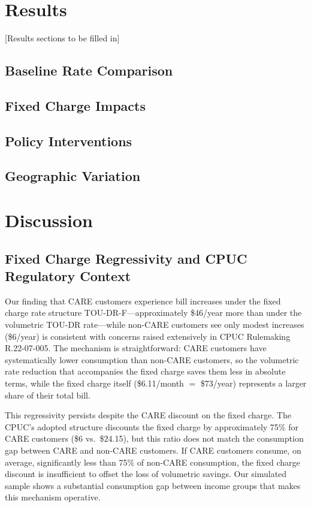 \documentclass[12pt]{article}
\begin{document}
\section{Results}
[Results sections to be filled in]

\subsection{Baseline Rate Comparison}

\subsection{Fixed Charge Impacts}

\subsection{Policy Interventions}

\subsection{Geographic Variation}

\section{Discussion}
\label{sec:discussion}

\subsection{Fixed Charge Regressivity and CPUC Regulatory Context}
\label{sec:regulatory_context}

Our finding that CARE customers experience bill increases under the fixed charge rate structure TOU-DR-F---approximately \$46/year more than under the volumetric TOU-DR rate---while non-CARE customers see only modest increases (\$6/year) is consistent with concerns raised extensively in CPUC Rulemaking R.22-07-005. The mechanism is straightforward: CARE customers have systematically lower consumption than non-CARE customers, so the volumetric rate reduction that accompanies the fixed charge saves them less in absolute terms, while the fixed charge itself (\$6.11/month $= $ \$73/year) represents a larger share of their total bill.

This regressivity persists despite the CARE discount on the fixed charge. The CPUC's adopted structure discounts the fixed charge by approximately 75\% for CARE customers (\$6 vs.\ \$24.15), but this ratio does not match the consumption gap between CARE and non-CARE customers. If CARE customers consume, on average, significantly less than 75\% of non-CARE consumption, the fixed charge discount is insufficient to offset the loss of volumetric savings. Our simulated sample shows a substantial consumption gap between income groups that makes this mechanism operative.
\end{document}
